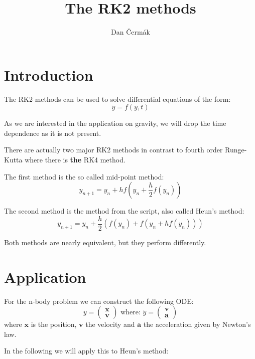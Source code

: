 \documentclass[a4paper,10pt,openany]{article}
\title{The RK2 methods}
\author{Dan Čermák}
\begin{document}
\maketitle

\section{Introduction}

The RK2 methods can be used to solve differential equations of the form:
\begin{equation}
\dot{y} = f(y, t)
\end{equation}

As we are interested in the application on gravity, we will drop the time dependence as it is not present.

There are actually two major RK2 methods in contrast to fourth order Runge-Kutta where there is \textbf{the} RK4 method.

The first method is the so called mid-point method:
\begin{equation}
 y_{n+1} = y_n + hf\left( y_n+\frac{h}{2}f( y_n) \right)
\end{equation}

The second method is the method from the script, also called Heun's method:
\begin{equation}
y_{n+1} = y_{n} + \frac{h}{2} \left( f( y_n) + f(y_n + h f(y_n)) \right)
\end{equation}

Both methods are nearly equivalent, but they perform differently.


\section{Application}

For the n-body problem we can construct the following ODE:
\begin{equation}
y = \begin{pmatrix} \mathbf{x}\\ \mathbf{v} \end{pmatrix} \text{ where: }\dot{y} = \begin{pmatrix} \mathbf{v}\\ \mathbf{a} \end{pmatrix}
\end{equation}
where $\mathbf{x}$ is the position, $\mathbf{v}$ the velocity and $\mathbf{a}$ the acceleration given by Newton's law.

In the following we will apply this to Heun's method:
\end{document}

